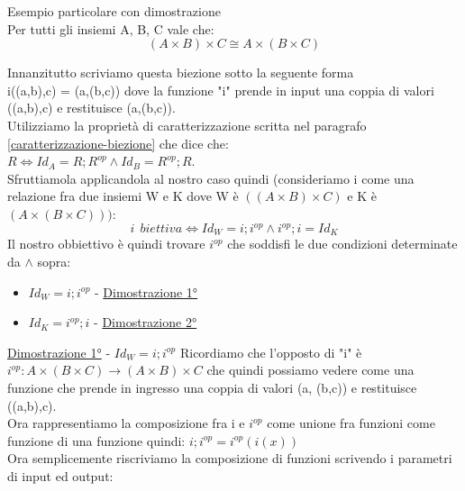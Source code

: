 \begin{example} Esempio particolare con dimostrazione \\
        Per tutti gli insiemi A, B, C vale che:
        \begin{equation}
            (A \times B) \times C \cong A \times (B \times C)
        \end{equation}
        \begin{demostration}
            Innanzitutto scriviamo questa biezione sotto la seguente forma \\i((a,b),c) = (a,(b,c)) dove la funzione "i" prende in input una coppia di valori ((a,b),c) e restituisce (a,(b,c)).\\
            Utilizziamo la proprietà di caratterizzazione scritta nel paragrafo \ref{caratterizzazione-biezione} che dice che: \\ $R \Longleftrightarrow Id_A = R;R^{op} \land Id_B = R^{op};R$.\\
            Sfruttiamola applicandola al nostro caso quindi (consideriamo i come una relazione fra due insiemi W e K dove W è $((A \times B) \times C)$ e K è $(A \times (B \times C)))$:
            \begin{equation}
                i \: \: biettiva \Longleftrightarrow Id_W = i;i^{op} \land i^{op};i = Id_K
            \end{equation}
            Il nostro obbiettivo è quindi trovare $i^{op}$ che soddisfi le due condizioni determinate da $\land$ sopra:
            \begin{itemize}
                \item $Id_W = i;i^{op}$ - \underline{Dimostrazione 1°}
                \item $Id_K = i^{op};i$ - \underline{Dimostrazione 2°}
            \end{itemize}
                \underline{Dimostrazione 1°} - $Id_W = i;i^{op}$
                Ricordiamo che l'opposto di "i" è $i^{op}: A \times (B \times C) \longrightarrow (A \times B) \times C$ che quindi possiamo vedere come una funzione che prende in ingresso una coppia di valori (a, (b,c)) e restituisce ((a,b),c).\\
                Ora rappresentiamo la composizione fra i e $i^{op}$ come unione fra funzioni come funzione di una funzione quindi: $i;i^{op} = i^{op}(i(x))$\\
                Ora semplicemente riscriviamo la composizione di funzioni scrivendo i parametri di input ed output:
                \begin{equation}

\end{equation}
\end{demostration}
\end{example}
